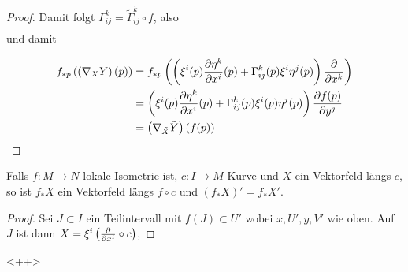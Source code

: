 \documentclass{skript}
\begin{document}
\begin{proof}
  Damit folgt $\Gamma_{ij}^k = \tilde\Gamma_{ij}^k\circ f$, also
  \begin{align*}
  \end{align*}
  und damit

  \begin{align*}
    f_{*p}\left( \left( \nabla_XY \right)(p) \right) &= f_{*p}\left( \left(
    \xi^i(p) \dd{x^i}{\eta^k}(p) + \Gamma^k_{ij}(p)\xi^i\eta^j(p)
    \right)\del{k}
    \right) \\
    &= \left( \xi^i(p)\frac{\partial \eta^k}{\partial x^i}(p) +
    \Gamma^k_{ij}(p)\xi^i(p)\eta^j(p) \right)\dd{y^j}{f(p)} \\
    &= \left( \nabla_{\tilde X}\tilde Y \right)\left( f(p) \right)
  \end{align*}
\end{proof}

\begin{flg}
  Falls $f:M\to N$ lokale Isometrie ist, $c:I\to M$ Kurve und $X$ ein Vektorfeld
  längs $c$, so ist $f_*X$ ein Vektorfeld längs $f\circ c$ und $(f_*X)' =
  f_*X'$.
  \begin{proof}
    Sei $J\subset I$ ein Teilintervall mit $f(J)\subset U'$ wobei $x,U',y,V'$
    wie oben. Auf $J$ ist dann $X = \xi^i\left( \del{i}\circ c \right)$, 
  \end{proof}<++>
\end{flg}
\end{document}
